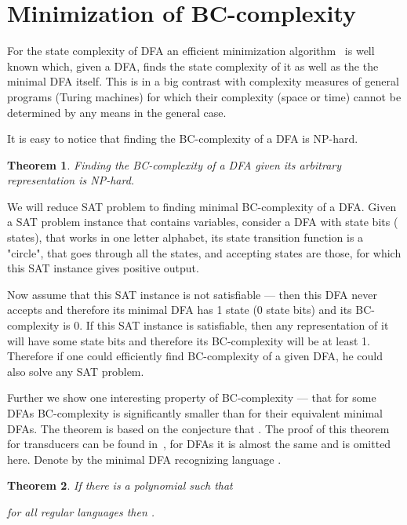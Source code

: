 \documentclass[copyright, creativecommons]{eptcs}
\newcommand{\qed}{}
\newtheorem{theorem}{Theorem}[section]
\newenvironment{proof}[1][Proof]{\begin{trivlist}
\item[\hskip \labelsep {\bfseries #1}]}{\end{trivlist}}
\begin{document}
\section{Minimization of BC-complexity}
\label{6nod}

For the state complexity of DFA an efficient minimization algorithm~\cite{H71} is well known which, given a DFA, finds
the state complexity of it as well as the the minimal DFA itself.
This is in a big contrast with complexity measures of general programs (Turing machines) for which their complexity
(space or time) cannot be determined by any means in the general case.

It is easy to notice that finding the BC-complexity of a DFA is NP-hard.
\begin{theorem}
Finding the BC-complexity of a DFA given its arbitrary representation is NP-hard.
\end{theorem}
\begin{proof}
We will reduce SAT problem to finding minimal BC-complexity of a DFA. Given a SAT problem instance that contains  variables,
consider a DFA with  state bits ( states), that works in one letter alphabet, its state transition
function is a "circle", that goes through all the states, and accepting states are those, for which this SAT
instance gives positive output.

Now assume that this SAT instance is not satisfiable --- then this DFA never accepts and therefore its minimal DFA
has 1 state (0 state bits) and its BC-complexity is 0. If this SAT instance
is satisfiable, then any representation of it  will have some state bits and therefore its BC-complexity will be at least 1.
Therefore if one could efficiently find BC-complexity of a given DFA, he could also solve any SAT problem.
\qed
\end{proof}

Further we show one interesting property of BC-complexity --- that
for some DFAs  BC-complexity is significantly smaller than for
their equivalent minimal DFAs. 
The theorem is based on the conjecture that .
The proof of this theorem for transducers can be found in~\cite{V11}, for DFAs it is almost the same and is omitted here.
Denote by  the minimal DFA recognizing language .

\begin{theorem}
If there is a polynomial  such that

for all regular languages  then .
\label{superTeorem}
\end{theorem}
\end{document}
